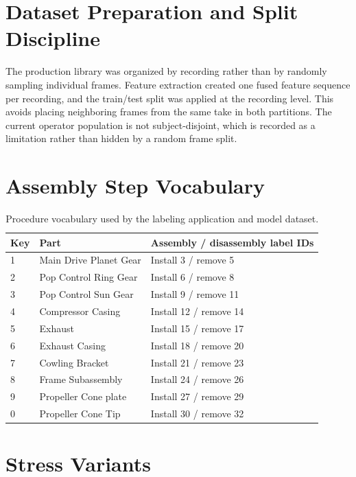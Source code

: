 \section{Dataset Preparation and Split Discipline}

The production library was organized by recording rather than by randomly
sampling individual frames. Feature extraction created one fused feature
sequence per recording, and the train/test split was applied at the recording
level. This avoids placing neighboring frames from the same take in both
partitions. The current operator population is not subject-disjoint, which is
recorded as a limitation rather than hidden by a random frame split.

\section{Assembly Step Vocabulary}

\begin{table}[H]
\centering
\small
\begin{tabularx}{\textwidth}{@{}p{}p{}X@{}}
\toprule
\textbf{Key} & \textbf{Part} & \textbf{Assembly / disassembly label IDs} \\
\midrule
1 & Main Drive Planet Gear & Install 3 / remove 5 \\
2 & Pop Control Ring Gear & Install 6 / remove 8 \\
3 & Pop Control Sun Gear & Install 9 / remove 11 \\
4 & Compressor Casing & Install 12 / remove 14 \\
5 & Exhaust & Install 15 / remove 17 \\
6 & Exhaust Casing & Install 18 / remove 20 \\
7 & Cowling Bracket & Install 21 / remove 23 \\
8 & Frame Subassembly & Install 24 / remove 26 \\
9 & Propeller Cone plate & Install 27 / remove 29 \\
0 & Propeller Cone Tip & Install 30 / remove 32 \\
\bottomrule
\end{tabularx}
\caption{Procedure vocabulary used by the labeling application and model
dataset.}
\label{tab:step-vocabulary}
\end{table}

\section{Stress Variants}

